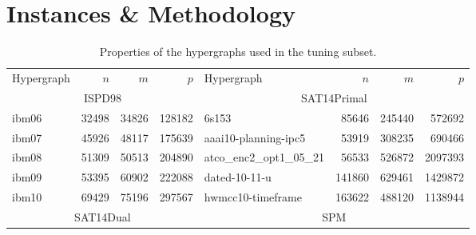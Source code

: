 \documentclass[a4paper,12pt,titlepage, BCOR7mm,headsepline]{scrbook}
\numberwithin{equation}{section}
\begin{document}
\section{Instances \& Methodology}
\label{sec:methodology}
\begin{table}[H]
        \caption{Properties of the hypergraphs used in the tuning subset.}
\label{tbl:instancessmall}

\centering
\begin{adjustbox}{max width=\textwidth}
\begin{tabular}{lrrr||l|rrr}
Hypergraph & $n$& $m$ & $p$ & Hypergraph & $n$ & $m$ & $p$\\
                         \cline{1-4}
                         \cline{5-8}
                         \cline{5-8}
                         \cline{1-4}
                         \cline{1-4}
                         \multicolumn{4}{c||}{ISPD98}          & \multicolumn{4}{c}{SAT14Primal} \\
                         \cline{5-8}
                         \cline{5-8}
                         \cline{1-4}
                         \cline{1-4}

                         ibm06                                 & 32498   & 34826  & 128182 & 6s153                                                & 85646   & 245440 & 572692            \\
                         ibm07                                 & 45926   & 48117  & 175639& aaai10-planning-ipc5              & 53919   & 308235 & 690466   \\
                         ibm08                                 & 51309   & 50513  & 204890& atco\_enc2\_opt1\_05\_21                             & 56533   & 526872 & 2097393  \\
                         ibm09                                 & 53395   & 60902  & 222088& dated-10-11-u                                        & 141860  & 629461 & 1429872  \\
                         ibm10                                 & 69429   & 75196  & 297567& hwmcc10-timeframe & 163622  & 488120 & 1138944  \\
                         \cline{1-4}
                         \cline{1-4}
                         \cline{5-8}
                         \cline{5-8}
                         \multicolumn{4}{c||}{SAT14Dual} & \multicolumn{4}{c}{SPM} \\
                         \cline{5-8}
                         \cline{5-8}
                         \cline{1-4}
                         \cline{1-4}


\end{tabular}
\end{adjustbox}
\end{table}
\end{document}
